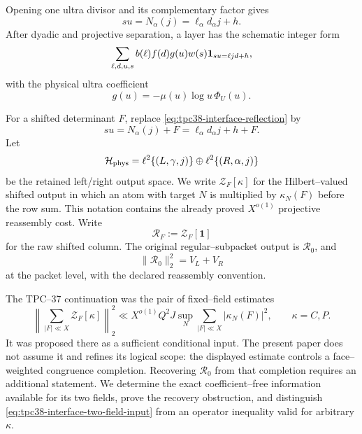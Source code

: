 Opening one ultra divisor and its complementary factor gives
\begin{equation}
 su=N_\alpha(j)=\ell_\alpha d_\alpha j+h.
 \label{eq:tpc38-interface-reflection}
\end{equation}
After dyadic and projective separation, a layer has the schematic integer
form
\begin{equation}
 \sum_{\ell,d,u,s}b(\ell)f(d)g(u)w(s)
 \mathbf 1_{su=\ell jd+h},
 \label{eq:tpc38-interface-integer-core}
\end{equation}
with the physical ultra coefficient
\begin{equation}
 g(u)=-\mu(u)\log u\,\Phi_U(u).
 \label{eq:tpc38-interface-physical-ultra}
\end{equation}

For a shifted determinant \(F\), replace
\eqref{eq:tpc38-interface-reflection} by
\begin{equation}
 su=N_\alpha(j)+F
 =\ell_\alpha d_\alpha j+h+F.
 \label{eq:tpc38-interface-shifted-fiber}
\end{equation}
Let
\begin{equation}
 \mathcal H_{\rm phys}
 =\ell^2\{(L,\gamma,j)\}
 \oplus\ell^2\{(R,\alpha,j)\}
 \label{eq:tpc38-interface-Hphys}
\end{equation}
be the retained left/right output space.  We write \(\mathscr Z_F[\kappa]\)
for the Hilbert--valued shifted output in which an atom with target \(N\)
is multiplied by \(\kappa_N(F)\) before the row sum.  This notation
contains the already proved \(X^{o(1)}\) projective reassembly cost.
Write
\begin{equation}
 \mathscr R_F:=\mathscr Z_F[\mathbf1]
 \label{eq:tpc38-interface-raw-shifted-output}
\end{equation}
for the raw shifted column.  The original regular--subpacket output is
\(\mathscr R_0\), and
\begin{equation}
 \|\mathscr R_0\|_2^2=V_L+V_R
 \label{eq:tpc38-interface-original-output}
\end{equation}
at the packet level, with the declared reassembly convention.

The TPC--37 continuation was the pair of fixed--field estimates
\begin{equation}
 \left\|\sum_{|F|\ll X}\mathscr Z_F[\kappa]\right\|_2^2
 \ll X^{o(1)}Q^2J
 \sup_N\sum_{|F|\ll X}|\kappa_N(F)|^2,
 \qquad \kappa=C,P.
 \label{eq:tpc38-interface-two-field-input}
\end{equation}
It was proposed there as a sufficient conditional input.  The present
paper does not assume it and refines its logical scope: the displayed
estimate controls a face--weighted congruence completion.  Recovering
\(\mathscr R_0\) from that completion requires an additional statement.
We determine the exact coefficient--free information available for its two
fields, prove the recovery obstruction, and distinguish
\eqref{eq:tpc38-interface-two-field-input} from an operator inequality valid
for arbitrary \(\kappa\).

